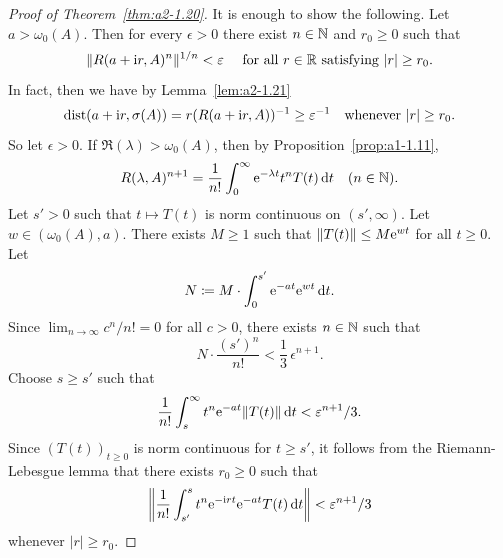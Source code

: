 \begin{proof}[Proof of Theorem~\ref{thm:a2-1.20}]
It is enough to show the following.
Let $a > \omega_{0}(A)$.
Then for every $\epsilon > 0$ there exist $n \in \mathbb{N}$ and $r_0 \geq 0$ such that
\[
\|R(a+ \iu r,A)^n\|^{1/n} < \epsilon \quad  \text{ for all } r \in \R \text{ satisfying $|r| \geq r_{0}$.}
\]
In fact, then we have by Lemma~\ref{lem:a2-1.21} 
\[
\text{dist}(a+\iu r,\sigma(A)) = r(R(a+ \iu r,A))^{-1} \geq \epsilon^{-1} \quad \text{whenever $|r| \geq r_{0}$.}
\]
So let $\epsilon > 0$.
If\/ $\Re(\lambda) > \omega_{0}(A)$, then by Proposition~\ref{prop:a1-1.11},
\[
R(\lambda,A)^{n+1} = \frac{1}{n!}\int_0^\infty \mathrm{e}^{-\lambda t}t^nT(t) \mathop{}\!\mathrm{d}{t} \quad (n \in \mathbb{N}).
\]
Let $s' > 0$ such that $t \mapsto T(t)$ is norm continuous on $(s',\infty)$.
Let $w \in (\omega_{0}(A),a)$.
There exists $M \geq 1$ such that $\|T(t)\| \leq M\eu^{wt}$ for all $t \geq 0$.
Let 
\[
N \coloneq M\cdot\int_{0}^{s'} \mathrm{e}^{-at}\mathrm{e}^{wt} \mathop{}\!\mathrm{d}{t}.
\]
Since $\lim_{n\to\infty} c^n/n! = 0$ for all $c > 0$, there exists $n \in \mathbb{N}$ such that 
%
\[
	N\cdot \frac{(s')^n}{n!} < \frac{1}{3}\,\epsilon^{n+1}.
\]
%
Choose $s \geq s'$ such that 
%
\[
	\frac{1}{n!}\int_{s}^{\infty} t^n\eu^{-at}\|T(t)\| \dt < \epsilon^{n+1}/3 .
\]
%
Since $(T(t))_{t\geq 0}$ is norm continuous for $t \geq s'$, it follows from the Riemann-Lebesgue lemma that there exists $r_{0} \geq 0$ such that 
\[
\left\lVert \frac{1}{n!}\int_{s'}^s t^{n}\eu^{-\iu rt}\eu^{-at}T(t) \dt \right\rVert  < \epsilon^{n+1}/3
\]
 whenever $|r| \geq r_{0}$.


\end{proof}
